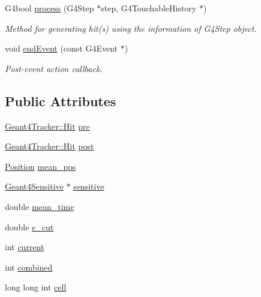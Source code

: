 \begin{DoxyCompactItemize}
G4bool \hyperlink{struct_d_d4hep_1_1_simulation_1_1_tracker_combine_a8d3a583a2f70cb49bcc3d6eda5363a85}{process} (G4Step $\ast$step, G4TouchableHistory $\ast$)
\begin{DoxyCompactList}\small\item\em Method for generating hit(s) using the information of G4Step object. \item\end{DoxyCompactList}\item 
void \hyperlink{struct_d_d4hep_1_1_simulation_1_1_tracker_combine_a03b50811a7b164514baebc2f252fba62}{endEvent} (const G4Event $\ast$)
\begin{DoxyCompactList}\small\item\em Post-\/event action callback. \item\end{DoxyCompactList}\end{DoxyCompactItemize}
\subsection*{Public Attributes}
\begin{DoxyCompactItemize}
\item 
\hyperlink{class_d_d4hep_1_1_simulation_1_1_geant4_tracker_1_1_hit}{Geant4Tracker::Hit} \hyperlink{struct_d_d4hep_1_1_simulation_1_1_tracker_combine_a05e41bf826c42ad8e4ddefb914a9e079}{pre}
\item 
\hyperlink{class_d_d4hep_1_1_simulation_1_1_geant4_tracker_1_1_hit}{Geant4Tracker::Hit} \hyperlink{struct_d_d4hep_1_1_simulation_1_1_tracker_combine_a04a629d7ed0ac04fd945466a40bb7e48}{post}
\item 
\hyperlink{namespace_d_d4hep_1_1_simulation_ad6fd94b3439e31d1ba4b2e640d578558}{Position} \hyperlink{struct_d_d4hep_1_1_simulation_1_1_tracker_combine_a66a9636b7e0e4712718366da7db0ddf6}{mean\_\-pos}
\item 
\hyperlink{class_d_d4hep_1_1_simulation_1_1_geant4_sensitive}{Geant4Sensitive} $\ast$ \hyperlink{struct_d_d4hep_1_1_simulation_1_1_tracker_combine_afa91afc4a7df2a80a889ab1a1ba4d4b6}{sensitive}
\item 
double \hyperlink{struct_d_d4hep_1_1_simulation_1_1_tracker_combine_a88f539f333235ec8d8746fe11fd70e12}{mean\_\-time}
\item 
double \hyperlink{struct_d_d4hep_1_1_simulation_1_1_tracker_combine_acd9b60d0c1b8cee45c1745a4ae167d24}{e\_\-cut}
\item 
int \hyperlink{struct_d_d4hep_1_1_simulation_1_1_tracker_combine_aa8bb9faf2d8ce6bac98f969e5bb9943c}{current}
\item 
int \hyperlink{struct_d_d4hep_1_1_simulation_1_1_tracker_combine_a09c500ccd4bca917b081930ae9e2c5ce}{combined}
\item 
long long int \hyperlink{struct_d_d4hep_1_1_simulation_1_1_tracker_combine_a93f684a7d6865b0f92a82560b3558d0d}{cell}
\end{DoxyCompactItemize}



